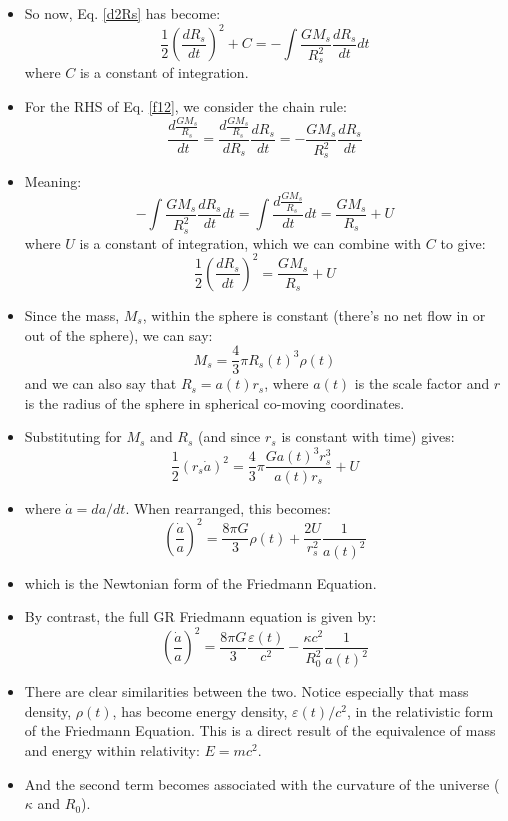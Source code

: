 \documentclass[11pt]{article}
\begin{document}
\begin{itemize}
\begin{equation}
\end{equation}
\item So now, Eq. \ref{d2Rs} has become:
\begin{equation}
    \label{f12}
    \frac{1}{2}\left(\frac{dR_s}{dt}\right)^2 + C = -\int\frac{GM_s}{R_s^2}\frac{dR_s}{dt}dt
\end{equation}
where $C$ is a constant of integration.
\item For the RHS of Eq. \ref{f12}, we consider the chain rule:
\begin{equation}
\frac{d\frac{GM_s}{R_s}}{dt} = \frac{d\frac{GM_s}{R_s}}{dR_s}\frac{dR_s}{dt} = -\frac{GM_s}{R_s^2}\frac{dR_s}{dt}
\end{equation}
\item Meaning:
\begin{equation}
-\int\frac{GM_s}{R_s^2}\frac{dR_s}{dt} dt = \int \frac{d\frac{GM_s}{R_s}}{dt}dt = \frac{GM_s}{R_s} + U
\end{equation}
where $U$ is a constant of integration, which we can combine with $C$ to give:
\begin{equation}
    \frac{1}{2}\left(\frac{dR_s}{dt}\right)^2 = \frac{GM_s}{R_s} + U
\end{equation}
\item Since the mass, $M_s$, within the sphere is constant (there's no net flow in or out of the sphere), we can say:
\begin{equation}
M_s = \frac{4}{3}\pi R_s(t)^3\rho(t)
\end{equation}
and we can also say that $R_s = a(t)r_s$, where $a(t)$ is the scale factor and $r$ is the radius of the sphere in spherical co-moving coordinates.
\item Substituting for $M_s$ and $R_s$ (and since $r_s$ is constant with time) gives:
\begin{equation}
\frac{1}{2}\left(r_s\dot{a}\right)^2 = \frac{4}{3}\pi\frac{Ga(t)^3r_s^3}{a(t)r_s} + U
\end{equation}
\item where $\dot{a} = da/dt$. When rearranged, this becomes:
\begin{equation}
\left(\frac{\dot{a}}{a}\right)^2 = \frac{8\pi G}{3}\rho(t) + \frac{2U}{r_s^2}\frac{1}{a(t)^2}
\end{equation}
\item which is the Newtonian form of the Friedmann Equation.
\item By contrast, the full GR Friedmann equation is given by:
\begin{equation}
\left(\frac{\dot{a}}{a}\right)^2 = \frac{8\pi G}{3}\frac{\varepsilon(t)}{c^2} - \frac{\kappa c^2}{R_0^2}\frac{1}{a(t)^2}    
\end{equation}
\item There are clear similarities between the two. Notice especially that mass density, $\rho(t)$, has become energy density, $\varepsilon(t)/c^2$, in the relativistic form of the Friedmann Equation. This is a direct result of the equivalence of mass and energy within relativity: $E = mc^2$.
\item And the second term becomes associated with the curvature of the universe ($\kappa$ and $R_0$). 
\end{itemize}
\end{document}
